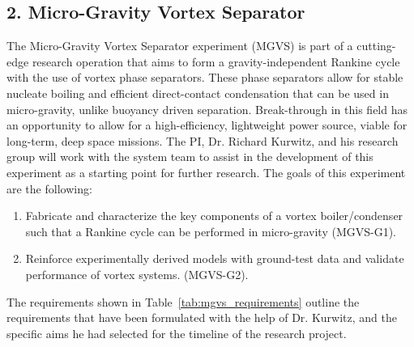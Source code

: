 \documentclass[conf]{new-aiaa}
\begin{document}
\clearpage
\subsection{2. Micro-Gravity Vortex Separator}

The Micro-Gravity Vortex Separator experiment (MGVS) is part of a cutting-edge research operation that aims to form a gravity-independent Rankine cycle with the use of vortex phase separators. These phase separators allow for stable nucleate boiling and efficient direct-contact condensation that can be used in micro-gravity, unlike buoyancy driven separation. Break-through in this field has an opportunity to allow for a high-efficiency, lightweight power source, viable for long-term, deep space missions. The PI, Dr. Richard Kurwitz, and his research group will work with the system team to assist in the development of this experiment as a starting point for further research. The goals of this experiment are the following: \cite{kurwitz-lsep-2026}

\vspace{0.3em}
\begin{enumerate}[leftmargin=*]
    \item Fabricate and characterize the key components of a vortex boiler/condenser such that a Rankine cycle can be performed in micro-gravity (MGVS-G1).
    \item Reinforce experimentally derived models with ground-test data and validate performance of vortex systems. (MGVS-G2).
\end{enumerate}

The requirements shown in Table~\ref{tab:mgvs_requirements} outline the requirements that have been formulated with the help of Dr. Kurwitz, and the specific aims he had selected for the timeline of the research project. \cite{kurwitz-lsep-2026}
\end{document}

